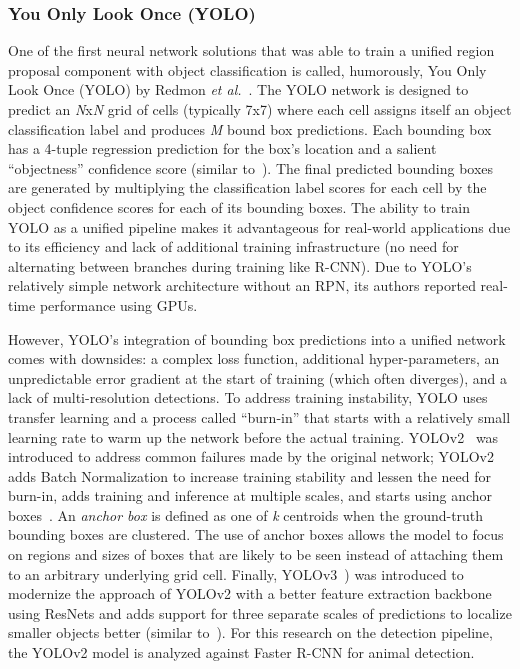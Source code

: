 \subsubsection{You Only Look Once (YOLO)}

One of the first neural network solutions that was able to train a unified region proposal component with object classification is called, humorously, You Only Look Once (YOLO) by Redmon \textit{et al.}~\cite{redmon_you_2016}.  The YOLO network is designed to predict an \textit{N}x\textit{N} grid of cells (typically 7x7) where each cell assigns itself an object classification label and produces \textit{M} bound box predictions.  Each bounding box has a 4-tuple regression prediction for the box's location and a salient ``objectness'' confidence score (similar to~\cite{kuo_deepbox:_2015}).  The final predicted bounding boxes are generated by multiplying the classification label scores for each cell by the object confidence scores for each of its bounding boxes.  The ability to train YOLO as a unified pipeline makes it advantageous for real-world applications due to its efficiency and lack of additional training infrastructure (no need for alternating between branches during training like R-CNN).  Due to YOLO's relatively simple network architecture without an RPN, its authors reported real-time performance using GPUs.

However, YOLO's integration of bounding box predictions into a unified network comes with downsides: a complex loss function, additional hyper-parameters, an unpredictable error gradient at the start of training (which often diverges), and a lack of multi-resolution detections.  To address training instability, YOLO uses transfer learning and a process called ``burn-in'' that starts with a relatively small learning rate to warm up the network before the actual training.  YOLOv2~\cite{redmon_yolo9000:_2016} was introduced to address common failures made by the original network; YOLOv2 adds Batch Normalization to increase training stability and lessen the need for burn-in, adds training and inference at multiple scales, and starts using anchor boxes~\cite{yu_unitbox_2016}.  An \textit{anchor box} is defined as one of \textit{k} centroids when the ground-truth bounding boxes are clustered.  The use of anchor boxes allows the model to focus on regions and sizes of boxes that are likely to be seen instead of attaching them to an arbitrary underlying grid cell. Finally, YOLOv3~\cite{redmon_yolov3_2018}) was introduced to modernize the approach of YOLOv2 with a better feature extraction backbone using ResNets and adds support for three separate scales of predictions to localize smaller objects better (similar to~\cite{li_scale-aware_2019}).  For this research on the detection pipeline, the YOLOv2 model is analyzed against Faster R-CNN for animal detection.

